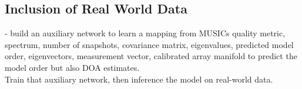 \subsection{Inclusion of Real World Data}
- build an auxiliary network to learn a mapping from MUSICs quality metric, spectrum, number of snapshots, covariance matrix, eigenvalues,
predicted model order, eigenvectors, measurement vector, calibrated array manifold to predict the model order but also
DOA estimates.\\
Train that auxiliary network, then inference the model on real-world data.
